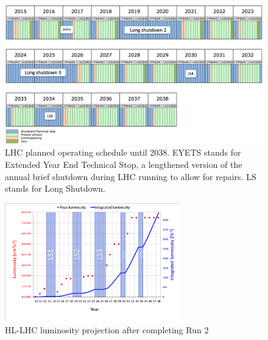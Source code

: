 \begin{figure}[htb!]
    \centering
    \includegraphics[width=4.5in]{figures/chapter2/lhc_sched.png}
    \caption{LHC planned operating schedule until 2038. EYETS stands for Extended Year End Technical Stop, a lengthened version of the annual brief shutdown during LHC running to allow for repairs. LS stands for Long Shutdown.}
    \label{fig:schedule}
\end{figure}

\begin{figure}[htb!]
    \centering
    \includegraphics[width=3in]{figures/chapter2/hl_lumi.png}
    \caption{HL-LHC luminosity projection after completing Run 2}
    \label{fig:hl_lumi}
\end{figure}

